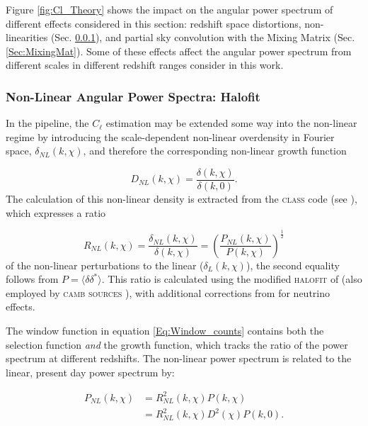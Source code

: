 \qquad Figure \ref{fig:Cl_Theory} shows the impact on the angular power spectrum of different effects considered in this section: redshift space distortions, non-linearities (Sec. \ref{Sec:NonLin}), and partial sky convolution with the Mixing Matrix (Sec. \ref{Sec:MixingMat}). Some of these effects affect the angular power spectrum from different scales in different redshift ranges consider in this work.

\subsubsection{Non-Linear Angular Power Spectra: Halofit}\label{Sec:NonLin}
In the \uclcl pipeline, the $C_{\ell}$ estimation may be extended some way into the non-linear regime by introducing the scale-dependent non-linear overdensity in Fourier space, $\delta_{NL}(k,\chi)$, and therefore the corresponding non-linear growth function 

\begin{equation}
D_{NL}(k,\chi) = \frac{\delta(k,\chi)}{\delta(k,0)}.
\end{equation}
The calculation of this non-linear density is extracted from the \textsc{class} code (see \cite{Class,CLASSgal}), which expresses a ratio

\begin{equation}
R_{NL}(k,\chi) = \frac{\delta_{NL}(k,\chi)}{\delta(k,\chi)} = \left( \frac{P_{NL}(k,\chi)}{P(k,\chi)} \right)^{\frac{1}{2}}
\end{equation}
of the non-linear perturbations to the linear ($\delta_L(k,\chi)$), the second equality follows from $P = \langle \delta \delta^* \rangle$. This ratio is calculated using the modified \textsc{halofit} of \cite{Takahashi2012} (also employed by \textsc{camb sources} \citep{CambSources}), with additional corrections from \cite{Bird2012} for neutrino effects. 

\qquad The window function in equation \ref{Eq:Window_counts} contains both the selection function \emph{and} the growth function, which tracks the ratio of the power spectrum at different redshifts. The non-linear power spectrum is related to the linear, present day power spectrum by:

\begin{equation}
\begin{split}
P_{NL}(k,\chi) & = R^2_{NL}(k,\chi) P(k,\chi) \\
& = R^2_{NL}(k,\chi) D^2(\chi) P(k,0).
\end{split}\end{equation}

